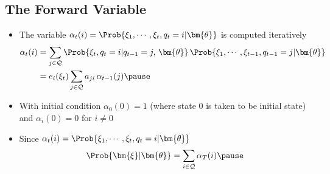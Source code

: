 
\begin{slide}
\section[-1]{The Forward Variable}

\begin{PauseHighLight}
  \begin{itemize}
  \item The variable $\alpha_t(i) = \Prob{\xi_1,\cdots,\xi_t, q_t = i|\bm{\theta}}$
    is computed iteratively
    \begin{align*}
      \alpha_t(i) &= \sum_{j\in\mathcal{Q}} 
                    \Prob{\xi_t, q_t=i| q_{t-1}=j,\, \bm{\theta}} \,
                    \Prob{\xi_1,\cdots,\xi_{t-1}, q_{t-1} = j|\bm{\theta}}
      \\
      &= e_i(\xi_t) \sum_{j\in\mathcal{Q}} a_{ji}\, \alpha_{t-1}(j)\pause
    \end{align*}
  \item With initial condition $\alpha_0(0) = 1$ (where state 0
    is taken to be initial state) and $\alpha_i(0) = 0$ for $i\neq0$\pause
  \item Since $\alpha_t(i) = \Prob{\xi_1,\cdots,\xi_t, q_t = i|\bm{\theta}}$
    \begin{align*}
      \Prob{\bm{\xi}|\bm{\theta}} = \sum_{i\in\mathcal{Q}} \alpha_T(i)\pause
    \end{align*}
  \end{itemize}
\end{PauseHighLight}

\end{slide}


